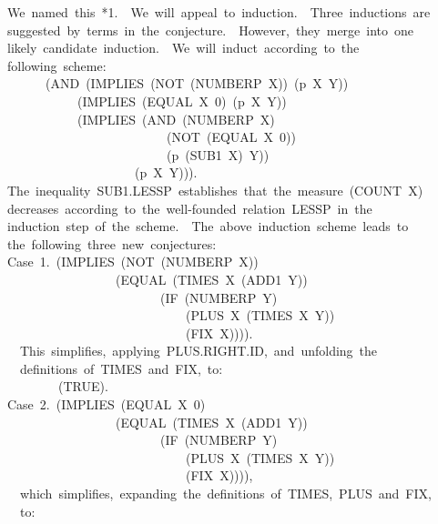 \documentclass[11pt]{book}
\newenvironment{pubasis}{\begin{flushleft}\ttfamily\small}{\normalsize\rmfamily\end{flushleft}}
\begin{document}
\begin{pubasis}
We~named~this~*1.~~We~will~appeal~to~induction.~~Three~inductions~are\\
suggested~by~terms~in~the~conjecture.~~However,~they~merge~into~one\\
likely~candidate~induction.~~We~will~induct~according~to~the\\
following~scheme:\\
~~~~~~(AND~(IMPLIES~(NOT~(NUMBERP~X))~(p~X~Y))\\
~~~~~~~~~~~(IMPLIES~(EQUAL~X~0)~(p~X~Y))\\
~~~~~~~~~~~(IMPLIES~(AND~(NUMBERP~X)\\
~~~~~~~~~~~~~~~~~~~~~~~~~(NOT~(EQUAL~X~0))\\
~~~~~~~~~~~~~~~~~~~~~~~~~(p~(SUB1~X)~Y))\\
~~~~~~~~~~~~~~~~~~~~(p~X~Y))).\\
The~inequality~SUB1.LESSP~establishes~that~the~measure~(COUNT~X)\\
decreases~according~to~the~well-founded~relation~LESSP~in~the\\
induction~step~of~the~scheme.~~The~above~induction~scheme~leads~to\\
the~following~three~new~conjectures:\\

Case~1.~(IMPLIES~(NOT~(NUMBERP~X))\\
~~~~~~~~~~~~~~~~~(EQUAL~(TIMES~X~(ADD1~Y))\\
~~~~~~~~~~~~~~~~~~~~~~~~(IF~(NUMBERP~Y)\\
~~~~~~~~~~~~~~~~~~~~~~~~~~~~(PLUS~X~(TIMES~X~Y))\\
~~~~~~~~~~~~~~~~~~~~~~~~~~~~(FIX~X)))).\\

~~This~simplifies,~applying~PLUS.RIGHT.ID,~and~unfolding~the\\
~~definitions~of~TIMES~and~FIX,~to:\\

~~~~~~~~(TRUE).\\

Case~2.~(IMPLIES~(EQUAL~X~0)\\
~~~~~~~~~~~~~~~~~(EQUAL~(TIMES~X~(ADD1~Y))\\
~~~~~~~~~~~~~~~~~~~~~~~~(IF~(NUMBERP~Y)\\
~~~~~~~~~~~~~~~~~~~~~~~~~~~~(PLUS~X~(TIMES~X~Y))\\
~~~~~~~~~~~~~~~~~~~~~~~~~~~~(FIX~X)))),\\

~~which~simplifies,~expanding~the~definitions~of~TIMES,~PLUS~and~FIX,\\
~~to:\\


\end{pubasis}
\end{document}

